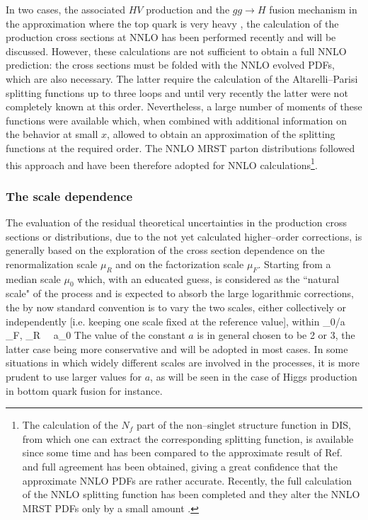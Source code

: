 In two cases, the associated $HV$ production \cite{pp-HV-NNLO}  and the $gg \to
H$ fusion mechanism in the approximation where the top quark is very heavy
\cite{ggH-NNLO1,ggH-NNLO2,ggH-NNLO3,ggH-NNLO-resum}, the calculation of
the production cross sections at NNLO has been performed recently and will be
discussed.  However, these calculations are not sufficient to obtain a full
NNLO prediction: the cross sections must be folded with the NNLO evolved PDFs,
which are also necessary. The latter require the calculation of the
Altarelli--Parisi splitting functions \cite{apsplit} up to three loops
and until very recently the latter were not completely known at this order.
Nevertheless, a large number of moments of these functions were available
\cite{van-neerven} which, when combined  with additional information on the
behavior at small $x$, allowed to obtain an approximation of the splitting
functions at the required order. The NNLO MRST \cite{MRSTNNLO} parton
distributions followed this approach and have been therefore adopted for NNLO
calculations\footnote{The calculation of the $N_f$ part of the non--singlet
structure function in DIS, from which one can extract the corresponding
splitting function, is available since some time and has been compared to the
approximate result of Ref.~\cite{van-neerven} and full agreement has been
obtained, giving a great confidence that the approximate NNLO PDFs are rather
accurate. Recently, the full calculation of the NNLO splitting function has
been completed \cite{NNLO-AP} and they alter the NNLO MRST PDFs only by a small
amount \cite{Thorne-rev}.}.

\vspace*{-2mm}
\subsubsection{The scale dependence}

The evaluation of the residual theoretical uncertainties in the production
cross  sections or distributions, due to the not yet calculated higher--order
corrections, is generally based on the exploration of the cross section
dependence on the renormalization scale $\mu_R$ and on the factorization scale
$\mu_F$. Starting from a median scale $\mu_0$ which, with an educated guess, is 
considered as the ``natural scale" of the process and is expected to
absorb the large logarithmic corrections, the by now standard convention is to 
vary the two scales, either  collectively or independently 
[i.e. keeping one scale fixed at the reference value], within
\beq 
\mu_0/a \, \leq \, \mu_F, \mu_R \, \leq  \, a\mu_0 
\eeq 
The value of the constant $a$ is in general chosen to be 2 or 3, the
latter case being more conservative and will be adopted in most cases. 
In some situations in which widely different scales are involved in the 
processes, it is more prudent to use larger values for $a$, as will be seen in 
the case of Higgs production in bottom quark fusion for instance. \s

